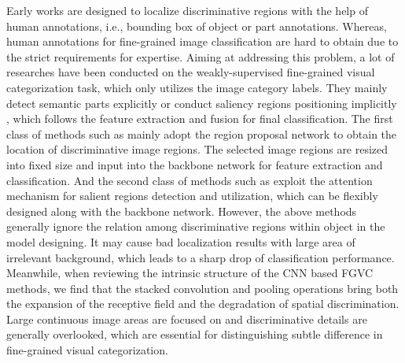 \documentclass[sigconf, nonacm]{acmart}
\begin{document}
Early works \cite{berg2013poof, zhang2014part, branson2014bird} are designed to localize discriminative regions with the help of human annotations, i.e., bounding box of object or part annotations. Whereas, human annotations for fine-grained image classification are hard to obtain due to the strict requirements for expertise. Aiming at addressing this problem, a lot of researches \cite{zheng2017learning, peng2018object, he2018fast, yang2018learning, wang2018learning, he2019and, chen2019destruction, ge2019weakly, ding2019selective, sun2020fine, zhou2020look,  du2020fine, wang2021dynamic} have been conducted on the weakly-supervised fine-grained visual categorization task, which only utilizes the image category labels. They mainly detect semantic parts explicitly \cite{zheng2017learning, yang2018learning, he2018fast, ge2019weakly} or conduct saliency regions positioning implicitly \cite{peng2018object, chen2019destruction, ding2019selective, zhou2020look}, which follows the feature extraction and fusion for final classification. The first class of methods such as \cite{he2018fast, ge2019weakly} mainly adopt the region proposal network to obtain the location of discriminative image regions. The selected image regions are resized into fixed size and input into the backbone network for feature extraction and classification. And the second class of methods such as \cite{peng2018object, ding2019selective} exploit the attention mechanism for salient regions detection and utilization, which can be flexibly designed along with the backbone network. However, the above methods generally ignore the relation among discriminative regions within object in the model designing. It may cause bad localization results with large area of irrelevant background, which leads to a sharp drop of classification performance. Meanwhile, when reviewing the intrinsic structure of the CNN based FGVC methods, we find that the stacked convolution and pooling operations bring both the expansion of the receptive field and the degradation of spatial discrimination. Large continuous image areas are focused on and discriminative details are generally overlooked, which are essential for distinguishing subtle difference in fine-grained visual categorization. 
\end{document}
